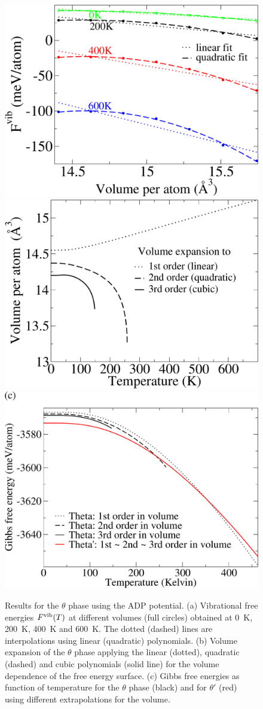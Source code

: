 \documentclass{article}
\begin{document}
\begin{figure}[H]
    \includegraphics[width=0.5\columnwidth]{albert_figures/Fvib_vs_Volume-crop.pdf}
    \includegraphics[width=0.5\columnwidth]{albert_figures/volume_expansion-crop.pdf}
    \includegraphics[width=1.0\columnwidth]{albert_figures/summary_phase_transition-crop.pdf}
    \caption{Results for the $\theta$ phase using the ADP potential. (a) Vibrational free energies $F^{\rm vib}(T)$ at different volumes (full circles) obtained at 0~K, 200~K, 400~K and 600~K. The dotted (dashed) lines are interpolations using linear (quadratic) polynomials. (b) Volume expansion of the $\theta$ phase applying the linear (dotted), quadratic (dashed) and cubic polynomials (solid line) for the volume dependence of the free energy surface. (c) Gibbs free energies as function of temperature for the $\theta$ phase (black) and for $\theta'$ (red) using different extrapolations for the volume.} 
    \label{fig1}
\end{figure}
\end{document}
